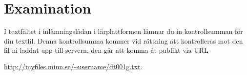 \documentclass[11pt,a4paper]{miunasgn}
\begin{document}
\section{Examination}
\label{sec:Examination}
\noindent
I textfältet i inlämningslådan i lärplattformen lämnar du in kontrollsumman för 
din textfil.
Denna kontrollsumma kommer vid rättning att kontrolleras mot den fil ni laddat 
upp till servern, den går att komma åt publikt via URL
\begin{center}
	\url{http://myfiles.miun.se/~username/dt001g.txt}.
\end{center}



\end{document}
